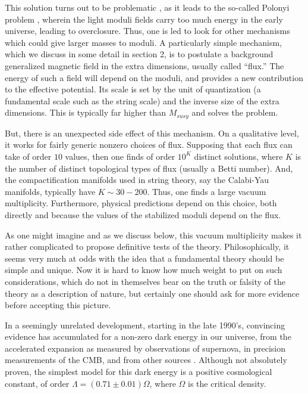 \documentclass[aps,amsfonts]{ar2e}
\begin{document}
This solution turns out to be problematic \cite{Banks:1993en,
deCarlos:1993jw}, as it leads to the so-called Polonyi problem
\cite{Coughlan:1983ci}, wherein the light moduli fields carry too
much energy in the early universe, leading to overclosure.  Thus,
one is led to look for other mechanisms which could give larger
masses to moduli.  A particularly simple mechanism, which we discuss
in some detail in section 2, is to postulate a background
generalized magnetic field in the extra dimensions, usually called
``flux.''  The energy of such a field will depend on the moduli, and
provides a new contribution to the effective potential.  Its scale
is set by the unit of quantization (a fundamental scale such as the
string scale) and the inverse size of the extra dimensions.  This is
typically far higher than $M_{susy}$ and solves the problem.

But, there is an unexpected side effect of this mechanism.  On a
qualitative level, it works for fairly generic nonzero choices of
flux.  Supposing that each flux can take of order $10$ values, then
one finds of order $10^K$ distinct solutions, where $K$ is the number
of distinct topological types of flux (usually a Betti number).  And,
the compactification manifolds used in string theory, say the
Calabi-Yau manifolds, typically have $K \sim 30-200$.  Thus,
one finds a large vacuum multiplicity.  Furthermore, physical
predictions depend on this choice, both directly and because the
values of the stabilized moduli depend on the flux.

As one might imagine and as we discuss below, this vacuum
multiplicity makes it rather complicated to propose definitive tests
of the theory.  Philosophically, it seems very much at odds with the
idea that a fundamental theory should be simple and unique.  Now it
is hard to know how much weight to put on such considerations, which
do not in themselves bear on the truth or falsity of the theory as a
description of nature, but certainly one should ask for more
evidence before accepting this picture.

In a seemingly unrelated development, starting in the late
1990's, convincing evidence has accumulated for a non-zero dark
energy in our universe, from the accelerated expansion as measured
by observations of supernova, in precision measurements of the CMB,
and from other sources
\cite{Peebles:2002gy}.
Although not absolutely proven, the
simplest model for this dark energy is a positive cosmological
constant, of order $\Lambda = (0.71\pm 0.01)\Omega$, where $\Omega$
is the critical density.
\end{document}
